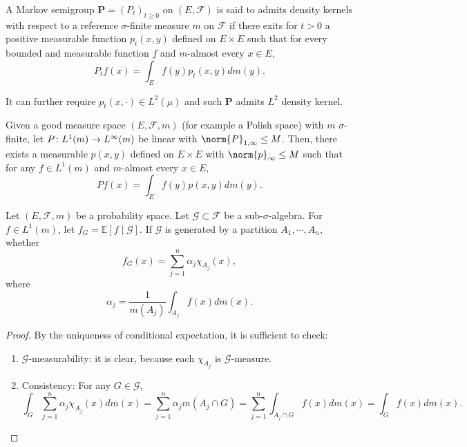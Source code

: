 \begin{enumerate}[label=\arabic{*}.]
	\begin{defn}
	    A Markov semigroup $\mathbf{P} = (P_t)_{t \geq 0}$ on $(E,\mathcal{F})$ is said to admits density kernels with respect to a reference $\sigma$-finite measure $m$ on $\mathcal{F}$ if there exits for $t > 0$ a positive measurable function $p_t(x,y)$ defined on $E \times E$ such that for every bounded and measurable function $f$ and $m$-almost every $x \in E$,
	    \begin{equation*}
	    	P_t f(x) = \int_E f(y)p_t(x,y)dm(y).
	    \end{equation*}
	\end{defn}
	It can further require $p_t(x,\cdot) \in L^2(\mu)$ and such $\mathbf{P}$ admits $L^2$ density kernel.


	\begin{prop}
	    Given a good measure space $(E,\mathcal{F},m)$ (for example a Polish space) with $m$ $\sigma$-finite, let $P \colon L^1(m) \rightarrow L^\infty(m)$ be linear with $\norm{P}_{1,\infty} \leq M$. Then, there exists a measurable $p(x,y)$ defined on $E \times E$ with $\norm{p}_{\infty} \leq M$ such that for any $f \in L^1(m)$ and $m$-almost every $x \in E$,
	    \begin{equation*}
	     	Pf(x) = \int_E f(y)p(x,y)dm(y).
	     \end{equation*} 
	\end{prop}

	\begin{lem}
	    Let $(E,\mathcal{F},m)$ be a probability space. Let $\mathcal{G} \subset \mathcal{F}$ be a sub-$\sigma$-algebra. For $f \in L^1(m)$, let $f_G = \mathbb{E}[f \mid \mathcal{G}]$. If $\mathcal{G}$ is generated by a partition $A_1,\cdots,A_n$, whether 
		$$
			f_G(x) = \sum_{j=1}^n \alpha_j \chi_{A_j}(x),
		$$
		where
		$$
			\alpha_j = \frac{1}{m(A_j)} \int_{A_j}f(x)dm(x).
		$$
	\end{lem}
	\begin{proof}
	    By the uniqueness of conditional expectation, it is sufficient to check:
	    \begin{enumerate}[label=(\roman*)]
	    	\item $\mathcal{G}$-measurability: it is clear, because each $\chi_{A_j}$ is $\mathcal{G}$-measure.
	    	\item Consistency: For any $G \in \mathcal{G}$,
	    	\begin{equation*}
	    		\int_G\sum_{j=1}^n \alpha_j \chi_{A_j}(x) dm(x) = \sum_{j=1}^n \alpha_j m(A_j \cap G) = \sum_{j=1}^n \int_{A_j \cap G}f(x)dm(x) = \int_G f(x)dm(x).
	    	\end{equation*}
	    \end{enumerate}
	\end{proof}


\end{enumerate}

